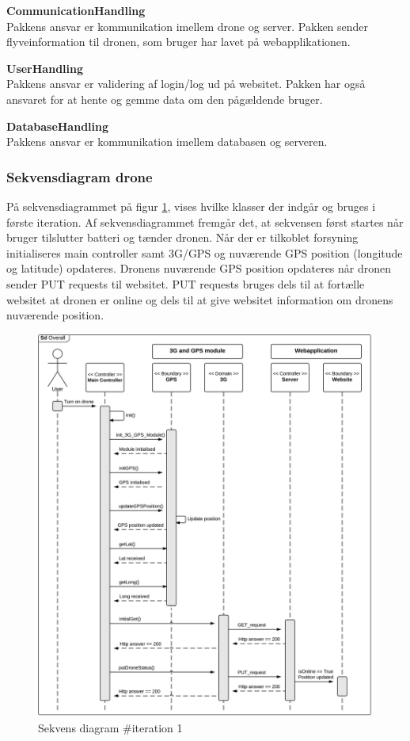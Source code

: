 \textbf{CommunicationHandling}\\
Pakkens ansvar er kommunikation imellem drone og server. Pakken sender flyveinformation til dronen, som bruger har lavet på webapplikationen.

\textbf{UserHandling}\\
Pakkens ansvar er validering af login/log ud på websitet. Pakken har også ansvaret for at hente og gemme data om den pågældende bruger.

\textbf{DatabaseHandling}\\
Pakkens ansvar er kommunikation imellem databasen og serveren. 


\newpage
\subsubsection*{Sekvensdiagram drone}
På sekvensdiagrammet på figur \ref{fig:Sekvens_diagram_iteration1}, vises hvilke klasser der indgår og bruges i første iteration. Af sekvensdiagrammet fremgår det, at sekvensen først startes når bruger tilslutter batteri og tænder dronen. Når der er tilkoblet forsyning initialiseres main controller samt 3G/GPS og nuværende GPS position  (longitude og latitude) opdateres. Dronens nuværende GPS position opdateres når dronen sender PUT requests til websitet. PUT requests bruges dels til at fortælle websitet at dronen er online og dels til at give websitet information om dronens nuværende position. 

\begin{figure}[H]
	\centering
	\includegraphics[width=1\textwidth]{Billeder/sekvens/sekvens_iteration1}
	\caption{Sekvens diagram \#iteration 1}
	\label{fig:Sekvens_diagram_iteration1}
\end{figure}
\newpage

